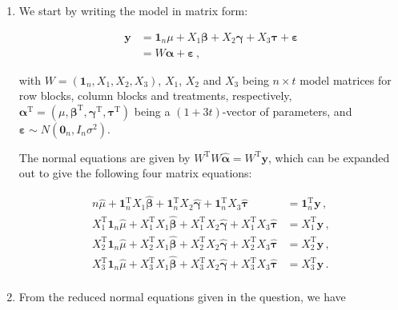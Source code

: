 \documentclass[
]{book}
\theoremstyle{definition}
\theoremstyle{definition}
\theoremstyle{definition}
\theoremstyle{definition}
\theoremstyle{remark}
\begin{document}
\begin{enumerate}
\def\labelenumi{\alph{enumi}.}
\item
  We start by writing the model in matrix form:

  \begin{align*}
   \boldsymbol{y}& = \boldsymbol{1}_n\mu + X_1\boldsymbol{\beta} + X_2\boldsymbol{\gamma} + X_3\boldsymbol{\tau} + \boldsymbol{\varepsilon}\\
   & = W\boldsymbol{\alpha} + \boldsymbol{\varepsilon}\,, 
   \end{align*}

  with \(W = (\boldsymbol{1}_n, X_1, X_2, X_3)\), \(X_1\), \(X_2\) and \(X_3\) being \(n \times t\) model matrices for row blocks, column blocks and treatments, respectively, \(\boldsymbol{\alpha}^{\mathrm{T}} = (\mu, \boldsymbol{\beta}^{\mathrm{T}}, \boldsymbol{\gamma}^{\mathrm{T}}, \boldsymbol{\tau}^{\mathrm{T}})\) being a \((1+3t)\)-vector of parameters, and \(\boldsymbol{\varepsilon}\sim N(\boldsymbol{0}_n, I_n\sigma^2)\).

  The normal equations are given by \(W^{\mathrm{T}}W\hat{\boldsymbol{\alpha}} = W^{\mathrm{T}}\boldsymbol{y}\), which can be expanded out to give the following four matrix equations:

  \begin{align}
  n\hat{\mu} + \boldsymbol{1}_n^{\mathrm{T}}X_1\hat{\boldsymbol{\beta}} + \boldsymbol{1}_n^{\mathrm{T}}X_2\hat{\boldsymbol{\gamma}} + \boldsymbol{1}_n^{\mathrm{T}}X_3\hat{\boldsymbol{\tau}} & = \boldsymbol{1}_n^{\mathrm{T}}\boldsymbol{y}\,, \label{eq:rc-normal-1}\\
  X_1^{\mathrm{T}}\boldsymbol{1}_n\hat{\mu} + X_1^{\mathrm{T}}X_1\hat{\boldsymbol{\beta}} + X_1^{\mathrm{T}}X_2\hat{\boldsymbol{\gamma}} + X_1^{\mathrm{T}}X_3\hat{\boldsymbol{\tau}} & = X_1^{\mathrm{T}}\boldsymbol{y}\,, \label{eq:rc-normal-2}\\
  X_2^{\mathrm{T}}\boldsymbol{1}_n\hat{\mu} + X_2^{\mathrm{T}}X_1\hat{\boldsymbol{\beta}} + X_2^{\mathrm{T}}X_2\hat{\boldsymbol{\gamma}} + X_2^{\mathrm{T}}X_3\hat{\boldsymbol{\tau}} & = X_2^{\mathrm{T}}\boldsymbol{y}\,, \label{eq:rc-normal-3}\\
  X_3^{\mathrm{T}}\boldsymbol{1}_n\hat{\mu} + X_3^{\mathrm{T}}X_1\hat{\boldsymbol{\beta}} + X_3^{\mathrm{T}}X_2\hat{\boldsymbol{\gamma}} + X_3^{\mathrm{T}}X_3\hat{\boldsymbol{\tau}} & = X_3^{\mathrm{T}}\boldsymbol{y}\,. \label{eq:rc-normal-4}\\
   \end{align}
\item
  From the reduced normal equations given in the question, we have


\end{enumerate}
\end{document}
